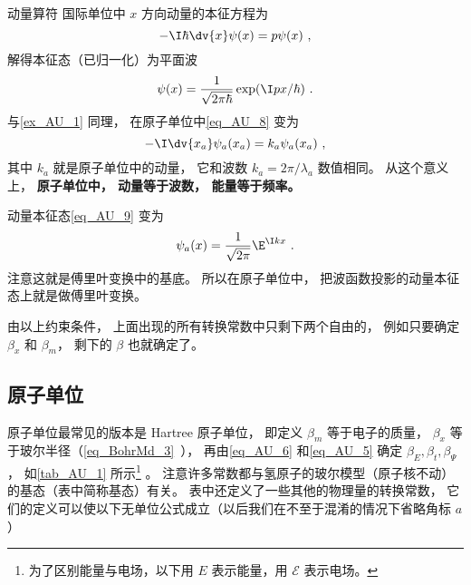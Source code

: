 \begin{example}{动量算符}\label{ex_AU_2}
国际单位中 $x$ 方向动量的本征方程为
\begin{equation}\label{eq_AU_8}
-\I\hbar \dv{x} \psi(x) = p \psi(x)~,
\end{equation}
解得本征态（已归一化）为平面波
\begin{equation}\label{eq_AU_9}
\psi(x) = \frac{1}{\sqrt{2\pi\hbar}}\exp(\I p x/\hbar)~.
\end{equation}
与\autoref{ex_AU_1} 同理， 在原子单位中\autoref{eq_AU_8} 变为
\begin{equation}
-\I\dv{x_a} \psi_a(x_a) = k_a \psi_a(x_a)~,
\end{equation}
其中 $k_a$ 就是原子单位中的动量， 它和波数 $k_a = 2\pi/\lambda_a$ 数值相同。 从这个意义上， \textbf{原子单位中， 动量等于波数， 能量等于频率。}

动量本征态\autoref{eq_AU_9} 变为
\begin{equation}
\psi_a(x) = \frac{1}{\sqrt{2\pi}}\E^{\I kx}~.
\end{equation}
注意这就是傅里叶变换中的基底。 所以在原子单位中， 把波函数投影的动量本征态上就是做傅里叶变换。
\end{example}

由以上约束条件， 上面出现的所有转换常数中只剩下两个自由的， 例如只要确定 $\beta_x$ 和 $\beta_m$， 剩下的 $\beta$ 也就确定了。

\subsection{原子单位}
原子单位最常见的版本是 Hartree 原子单位， 即定义 $\beta_m$ 等于电子的质量， $\beta_x$ 等于玻尔半径（\autoref{eq_BohrMd_3}~）， 再由\autoref{eq_AU_6} 和\autoref{eq_AU_5} 确定 $\beta_E, \beta_t, \beta_\Psi$， 如\autoref{tab_AU_1} 所示\footnote{为了区别能量与电场，以下用 $E$ 表示能量，用 $\mathcal{E}$ 表示电场。} 。 注意许多常数都与氢原子的玻尔模型（原子核不动）的基态（表中简称基态）有关。 表中还定义了一些其他的物理量的转换常数， 它们的定义可以使以下无单位公式成立（以后我们在不至于混淆的情况下省略角标 $a$）

